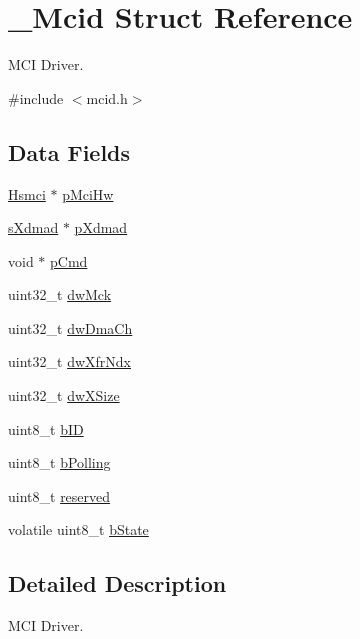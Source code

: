 \hypertarget{struct__Mcid}{}\section{\+\_\+\+Mcid Struct Reference}
\label{struct__Mcid}


M\+CI Driver.  




{\ttfamily \#include $<$mcid.\+h$>$}

\subsection*{Data Fields}
\begin{DoxyCompactItemize}
\item 
\mbox{\hyperlink{structHsmci}{Hsmci}} $\ast$ \mbox{\hyperlink{struct__Mcid_ad3cbbb9575f21ef189d3f42c047829ce}{p\+Mci\+Hw}}
\item 
\mbox{\hyperlink{group__dmad__structs_gaf2c13151514615a6beb35c0d868a5053}{s\+Xdmad}} $\ast$ \mbox{\hyperlink{struct__Mcid_a473ca87c4e75329e0fce0865c909d537}{p\+Xdmad}}
\item 
void $\ast$ \mbox{\hyperlink{struct__Mcid_a7131c2023da256370ea944710829c37a}{p\+Cmd}}
\item 
uint32\+\_\+t \mbox{\hyperlink{struct__Mcid_acaa674a44196de9ffd9a3206b21ac43d}{dw\+Mck}}
\item 
uint32\+\_\+t \mbox{\hyperlink{struct__Mcid_a0b402f365543d3f9a96bf522de7ce573}{dw\+Dma\+Ch}}
\item 
uint32\+\_\+t \mbox{\hyperlink{struct__Mcid_a7f20beb689125b7a34cfa8a8b29d0b94}{dw\+Xfr\+Ndx}}
\item 
uint32\+\_\+t \mbox{\hyperlink{struct__Mcid_a8bf0c59a5dfbb250c81ab74a167a737e}{dw\+X\+Size}}
\item 
uint8\+\_\+t \mbox{\hyperlink{struct__Mcid_a617e9a8764aed056707b1fb337c850c5}{b\+ID}}
\item 
uint8\+\_\+t \mbox{\hyperlink{struct__Mcid_aff7238b53d1765448bae3cd1f64c8b59}{b\+Polling}}
\item 
uint8\+\_\+t \mbox{\hyperlink{struct__Mcid_a2835e949ed391fd6560499024fea860b}{reserved}}
\item 
volatile uint8\+\_\+t \mbox{\hyperlink{struct__Mcid_af5a5b11262bc8b20ba78f882a207bf1c}{b\+State}}
\end{DoxyCompactItemize}


\subsection{Detailed Description}
M\+CI Driver. 

